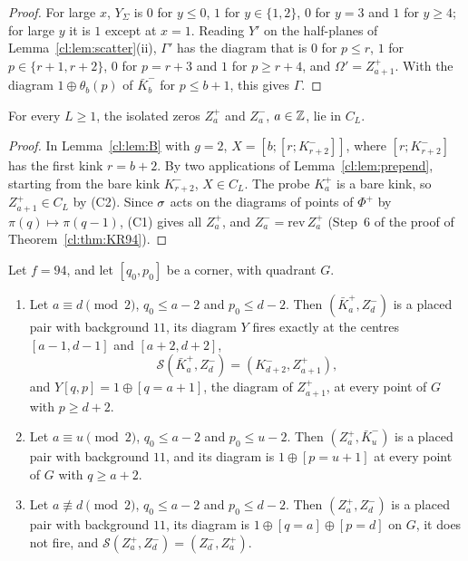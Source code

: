 \begin{proof}
For large $x$, $Y_\Sigma$ is $0$ for $y\le0$, $1$ for $y\in\{1,2\}$, $0$ for $y=3$ and $1$ for $y\ge4$; for large $y$ it is $1$ except at $x=1$. Reading $Y'$ on the half-planes of Lemma~\ref{cl:lem:scatter}(ii), $\Gamma'$ has the diagram that is $0$ for $p\le r$, $1$ for $p\in\{r+1,r+2\}$, $0$ for $p=r+3$ and $1$ for $p\ge r+4$, and $\Omega'=Z^+_{a+1}$. With the diagram $1\oplus\theta_b(p)$ of $\bar K^-_b$ for $p\le b+1$, this gives $\Gamma$.
\end{proof}

\begin{corollary}\label{cl:cor:zero}
For every $L\ge1$, the isolated zeros $Z^+_a$ and $Z^-_a$, $a\in\mathbb{Z}$, lie in $C_L$.
\end{corollary}

\begin{proof}
In Lemma~\ref{cl:lem:B} with $g=2$, $X=[b;[r;K^-_{r+2}]]$, where $[r;K^-_{r+2}]$ has the first kink $r=b+2$. By two applications of Lemma~\ref{cl:lem:prepend}, starting from the bare kink $K^-_{r+2}$, $X\in C_L$. The probe $K^+_a$ is a bare kink, so $Z^+_{a+1}\in C_L$ by (C2). Since $\sigma$ acts on the diagrams of points of $\Phi^+$ by $\pi(q)\mapsto\pi(q-1)$, (C1) gives all $Z^+_a$, and $Z^-_a=\mathrm{rev}\,Z^+_a$ (Step~6 of the proof of Theorem~\ref{cl:thm:KR94}).
\end{proof}

\begin{lemma}\label{cl:lem:exchange}
Let $f=94$, and let $[q_0,p_0]$ be a corner, with quadrant $G$.
\begin{enumerate}
\item[(i)] Let $a\equiv d\pmod2$, $q_0\le a-2$ and $p_0\le d-2$. Then $(\bar K^+_a,Z^-_d)$ is a placed pair with background $11$, its diagram $Y$ fires exactly at the centres $[a-1,d-1]$ and $[a+2,d+2]$,
\[
\mathcal S(\bar K^+_a,Z^-_d)=(K^-_{d+2},Z^+_{a+1}),
\]
and $Y[q,p]=1\oplus[q=a+1]$, the diagram of $Z^+_{a+1}$, at every point of $G$ with $p\ge d+2$.
\item[(ii)] Let $a\equiv u\pmod2$, $q_0\le a-2$ and $p_0\le u-2$. Then $(Z^+_a,\bar K^-_u)$ is a placed pair with background $11$, and its diagram is $1\oplus[p=u+1]$ at every point of $G$ with $q\ge a+2$.
\item[(iii)] Let $a\not\equiv d\pmod2$, $q_0\le a-2$ and $p_0\le d-2$. Then $(Z^+_a,Z^-_d)$ is a placed pair with background $11$, its diagram is $1\oplus[q=a]\oplus[p=d]$ on $G$, it does not fire, and $\mathcal S(Z^+_a,Z^-_d)=(Z^-_d,Z^+_a)$.
\end{enumerate}
\end{lemma}

